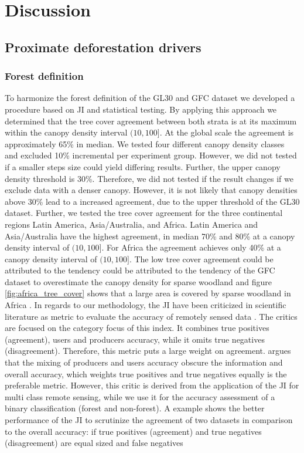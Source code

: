 \chapter{Discussion}
\label{ch:discussion}

	\section{Proximate deforestation drivers}
	\label{sec:discussion_deforestation}

		\subsection{Forest definition}
		\label{subsec:discussion_forest_definition}
			To harmonize the forest definition of the \ac{GL30} and \ac{GFC} dataset we developed a procedure based on \ac{JI} and statistical testing. By applying this approach we determined that the tree cover agreement between both strata is at its maximum within the canopy density interval $(10,100]$. At the global scale the agreement is approximately 65\% in median. We tested four different canopy density classes and excluded 10\% incremental per experiment group. However, we did not tested if a smaller steps size could yield differing results. Further, the upper canopy density threshold is 30\%. Therefore, we did not tested if the result changes if we exclude data with a denser canopy. However, it is not likely that canopy densities above 30\% lead to a increased agreement, due to the upper threshold of the \ac{GL30} dataset. Further, we tested the tree cover agreement for the three continental regions Latin America, Asia/Australia, and Africa. Latin America and Asia/Australia have the highest agreement, in median 70\% and 80\% at a canopy density interval of $(10,100]$. For Africa the agreement achieves only 40\% at a canopy density interval of $(10,100]$. The low tree cover agreement could be attributed to the tendency could be attributed to the tendency of the \ac{GFC} dataset to overestimate the canopy density for sparse woodland and figure \ref{fig:africa_tree_cover} shows that a large area is covered by sparse woodland in Africa \citep{Gross2017}. In regards to our methodology, the \ac{JI} have been criticized in scientific literature as metric to evaluate the accuracy of remotely sensed data \citep{Li2017a}. The critics are focused on the category focus of this index. It combines true positives (agreement), users and producers accuracy, while it omits true negatives (disagreement). Therefore, this metric puts a large weight on agreement. \citeauthor{Li2017a} argues that the mixing of producers and users accuracy obscure the information and overall accuracy, which weights true positives and true negatives equally is the preferable metric. However, this critic is derived from the application of the \ac{JI} for multi class remote sensing, while we use it for the accuracy assessment of a binary classification (forest and non-forest). A example shows the better performance of the \ac{JI} to scrutinize the agreement of two datasets in comparison to the overall accuracy: if true positives (agreement) and true negatives (disagreement) are equal sized and false negatives 